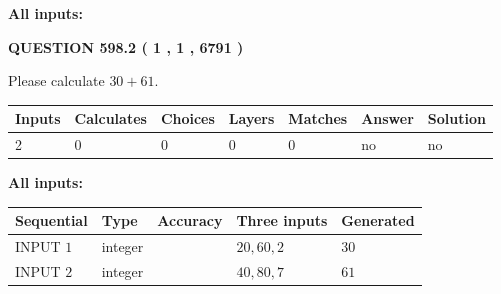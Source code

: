 \documentclass[12pt]{article}
\begin{document}
   
   
   
\noindent{}
   
   
   
   
\noindent\vspace{0.1in}\hspace{-0.08in} {\textbf{\Large{All inputs: }}}
   
   
  
\vspace{0.2in}
  
{\textbf{\Large{QUESTION
598.2 
 ( 1 , 1 , 6791 )
}}}
  
  
 
Please calculate $ %
30 +  %
61 $.
 
 
   
   
   
   
\noindent\begin{tabular}{|l|l|l|l|l|l|l|}
 \hline
Inputs & Calculates & Choices & Layers & Matches & Answer & Solution \\ \hline
 2  & 
 0  & 
 0
  & 
 0  & 
 0  & 
  no & 
  no 
  \\ \hline
 \end{tabular}
   
   
   
   
\noindent{}
   
   
   
   
\noindent\vspace{0.1in}\hspace{-0.08in} {\textbf{\Large{All inputs: }}}
   
   
  
  
\noindent\begin{tabular}{|l|l|l|l|l|}
\hline
 Sequential & Type & Accuracy & Three inputs & Generated \\ 
\hline
 
 
  INPUT $  1 $ & integer &  & $
 20
 , 
 60
 , 
 2
 $ & $ 30 $ 
 \\  \hline  
 
 
  INPUT $  2 $ & integer &  & $
 40
 , 
 80
 , 
 7
 $ & $ 61 $ 
 \\  \hline  
 \end{tabular}
   
   
   
   
   
   
 \vspace{0.2in}
 
\end{document}
